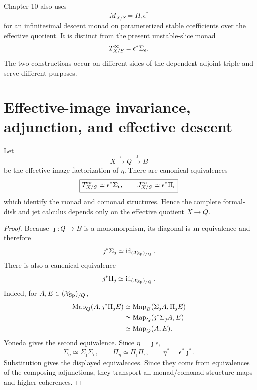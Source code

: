 \begin{remark}
Chapter 10 also uses
\[
    M_{X/S}=\Pi_\epsilon\epsilon^*
\]
for an infinitesimal descent monad on parameterized stable coefficients over the effective quotient.  It is distinct from the present unstable-slice monad
\[
    T^{\infty}_{X/S}=\epsilon^*\Sigma_\epsilon.
\]
The two constructions occur on different sides of the dependent adjoint triple and serve different purposes.
\end{remark}

\section{Effective-image invariance, adjunction, and effective descent}
\label{sec:jet-effective-image}
\label{sec:disk-jet-adjunction}
\label{sec:jet-descent}

\begin{theorem}
\label{thm:jet-effective-image}
Let
\[
    X\xrightarrow{\epsilon}Q\xrightarrow{\jmath}B
\]
be the effective-image factorization of $\eta$.  There are canonical equivalences
\[
    \boxed{
    T^{\infty}_{X/S}\simeq\epsilon^*\Sigma_\epsilon,
    \qquad
    J^{\infty}_{X/S}\simeq\epsilon^*\Pi_\epsilon
    }
\]
which identify the monad and comonad structures.  Hence the complete formal-disk and jet calculus depends only on the effective quotient $X\to Q$.
\end{theorem}

\begin{proof}
Because $\jmath:Q\to B$ is a monomorphism, its diagonal is an equivalence and therefore
\[
    \jmath^*\Sigma_\jmath\simeq\operatorname{id}_{(\mathcal{X}_{\mathrm{Sp}})_{/Q}}.
\]
There is also a canonical equivalence
\[
    \jmath^*\Pi_\jmath\simeq\operatorname{id}_{(\mathcal{X}_{\mathrm{Sp}})_{/Q}}.
\]
Indeed, for $A,E\in(\mathcal{X}_{\mathrm{Sp}})_{/Q}$,
\[
\begin{aligned}
\operatorname{Map}_Q(A,\jmath^*\Pi_\jmath E)
&\simeq
\operatorname{Map}_B(\Sigma_\jmath A,\Pi_\jmath E)\\
&\simeq
\operatorname{Map}_Q(\jmath^*\Sigma_\jmath A,E)\\
&\simeq
\operatorname{Map}_Q(A,E).
\end{aligned}
\]
Yoneda gives the second equivalence.  Since $\eta=\jmath\epsilon$,
\[
    \Sigma_\eta\simeq\Sigma_\jmath\Sigma_\epsilon,
    \qquad
    \Pi_\eta\simeq\Pi_\jmath\Pi_\epsilon,
    \qquad
    \eta^*=\epsilon^*\jmath^*.
\]
Substitution gives the displayed equivalences.  Since they come from equivalences of the composing adjunctions, they transport all monad/comonad structure maps and higher coherences.
\end{proof}


